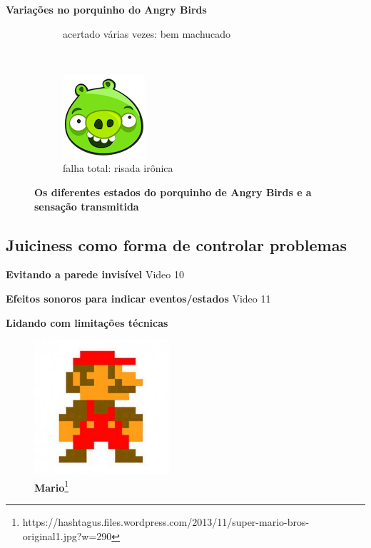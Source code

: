 \expandafter\documentclass\expandafter[table, usenames, svgnames, dvipsnames, \classopts]{beamer}
\begin{document}
\begin{frame}{\textbf{Variações no porquinho do Angry Birds}}
\begin{figure}
\begin{subfigure}[!h]{0.2\paperwidth}
	        \caption{\scriptsize acertado várias vezes: bem machucado}
	    \end{subfigure}
	    ~
		\begin{subfigure}[!h]{0.2\paperwidth}
			\centering
	        \includegraphics[draft,height=0.2\paperheight]{angry-birds-pig5}
	        \caption{\scriptsize falha total: risada irônica}
	    \end{subfigure}

	    \caption{\textbf{Os diferentes estados do porquinho de Angry Birds e a sensação transmitida}}
    \end{figure}

\end{frame}

\subsection{Juiciness como forma de controlar problemas}

\begin{frame}{\textbf{Evitando a parede invisível}}
    \centering
    Video 10
\end{frame}

\begin{frame}{\textbf{Efeitos sonoros para indicar eventos/estados}}
    \centering
    Video 11
\end{frame}

\begin{frame}{\textbf{Lidando com limitações técnicas}}
    \centering
    \begin{figure}
        \includegraphics[draft,height=5cm]{mario_original}
        \caption{\scriptsize\textbf{Mario}\footnote{https://hashtagus.files.wordpress.com/2013/11/super-mario-bros-original1.jpg?w=290}}
    \end{figure}
\end{frame}
\end{document}
